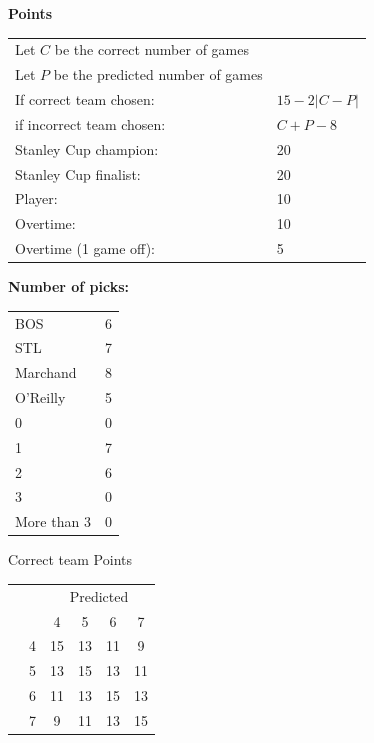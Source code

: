 \documentclass[10pt]{article}
\newcommand{\mccn}[2]{\multicolumn{#1}{c}{#2}}
\begin{document}
{\bf Points}\\
\begin{minipage}{10cm}
    \begin{tabular}{l l}
        Let $C$ be the correct number of games\\
        Let $P$ be the predicted number of games\\
        If correct team chosen:	   & $15 - 2 \left|{C - P}\right|$\\
        if incorrect team chosen:  & $C + P - 8$\\
        Stanley Cup champion:	& 20\\
        Stanley Cup finalist:	& 20\\
        Player:                 & 10\\
        Overtime:               & 10\\
        Overtime (1 game off):  & 5\\
    \end{tabular}

    \vspace{1cm}
    {\bf Number of picks:}\\
    \begin{tabular}{lc }
        BOS & 6 \\
        STL & 7 \\
        Marchand & 8 \\
        O'Reilly & 5 \\
        \rule{0pt}{3.5ex}0 & 0 & \\
        1 & 7 & \\
        2 & 6 & \\
        3 & 0 & \\
        More than 3 & 0 & 
    \end{tabular}
\end{minipage}
\begin{minipage}[t!]{4cm}
    \vspace{-2cm}
    \qquad Correct team Points\\
    \begin{tabular}{c l | c c c c }
        \mccn{2}{} & \mccn{4}{Predicted}\\
        & & 4 & 5 & 6 & 7\\\cline{2-6}
        \parbox[t]{2mm}{} & 4 & 15 & 13 & 11 & 9\\
        & 5 & 13 & 15 & 13 & 11\\
        & 6 & 11 & 13 & 15 & 13\\
        & 7 & 9 & 11 & 13 & 15
    \end{tabular}
\end{minipage}
\end{document}
